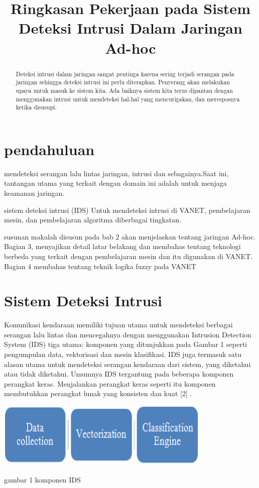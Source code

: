 \documentclass[conference]{IEEEtran}
\title{Ringkasan Pekerjaan pada Sistem Deteksi Intrusi Dalam Jaringan Ad-hoc}
\author{\IEEEauthorblockN{mahasiswa Teknik Komputer}
\IEEEauthorblockA{\textit{Fakultas Informatika}\\
\textit{Intitut Teknologi Batam}\\
Batam, Indonesia\\
Email: johanwilian455@gmail.com}}
\begin{document}
\maketitle
\begin{abstract}
    Deteksi intrusi dalam jaringan sangat pentinga karena sering terjadi serangan pada jaringan sehingga deteksi intrusi ini perlu diterapkan. Penyerang akan melakukan upaya untuk masuk ke sistem kita. Ada baiknya sistem kita terus dipantau dengan menggunakan intrusi untuk mendeteksi hal-hal yang mencurigakan, dan meresposnya ketika disusupi.
\end{abstract}

\section{pendahuluan}
    mendeteksi serangan lalu lintas jaringan, intrusi dan sebagainya.Saat ini, tantangan utama yang terkait dengan domain ini adalah untuk menjaga keamanan jaringan.
    
    sistem deteksi intrusi (IDS) Untuk mendeteksi intrusi di VANET, pembelajaran mesin, dan pembelajaran algoritma diberbagai tingkatan.
    
    susunan makalah disusun pada bab 2 akan menjelaskan tentang jaringan Ad-hoc. Bagian 3, menyajikan detail latar belakang dan membahas tentang teknologi berbeda yang terkait dengan pembelajaran mesin dan itu digunakan di VANET. Bagian 4 membahas tentang teknik logika fuzzy pada VANET

\section{Sistem Deteksi Intrusi}
    Komunikasi kendaraan memiliki tujuan utama untuk mendeteksi berbagai serangan lalu lintas dan mencegahnya dengan menggunakan Intrusion Detection System (IDS) tiga utama: komponen yang ditunjukkan pada Gambar 1 seperti pengumpulan data, vektorisasi dan mesin klasifikasi. IDS juga termasuk satu alasan utama untuk mendeteksi serangan kendaraan dari sistem, yang diketahui atau tidak diketahui. Umumnya IDS tergantung pada beberapa komponen perangkat keras. Menjalankan perangkat keras seperti itu komponen membutuhkan perangkat lunak yang konsisten dan kuat [2] \cite{zhang2010research}.
\begin{center}
\includegraphics[width=.5\textwidth]{gambar/tugas7-1.PNG}
\caption{gambar 1 komponen IDS}
\end{center}
\end{document}
